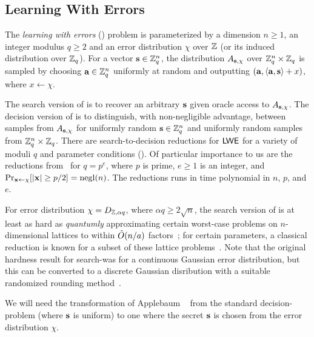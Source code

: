 \subsection{Learning With Errors}
\label{subsec:LWE}

The \emph{learning with errors} (\lwe) problem is parameterized by a
dimension $n\geq 1$, an integer modulus $q \geq 2$ and an error
distribution $\chi$ over $\mathbb{Z}$ (or its induced distribution over
$\mathbb{Z}_q$). For a vector $\mathbf{s} \in \mathbb{Z}_q^n$, the distribution $A_{\mathbf{s},
  \chi}$ over $\mathbb{Z}_q^n \times \mathbb{Z}_q$ is sampled by choosing $\mathbf{a} \in
\mathbb{Z}_q^n$ uniformly at random and outputting $(\mathbf{a}, \langle{\ensuremath{\mathbf{a}},
  \ensuremath{\mathbf{s}}}\rangle+x)$, where $x \gets \chi$.

The search version of \lwe is to recover an arbitrary $\mathbf{s}$ given
oracle access to $A_{\mathbf{s}, \chi}$. The decision version of \lwe is to
distinguish, with non-negligible advantage, between samples from
$A_{\mathbf{s}, \chi}$ for uniformly random $\mathbf{s} \in \mathbb{Z}_q^n$ and uniformly
random samples from $\mathbb{Z}_q^n \times \mathbb{Z}_q$. There are search-to-decision
reductions for $\mathsf{LWE}$ for a variety of moduli $q$ and parameter
conditions (\cite{DBLP:journals/jacm/Regev09,
  DBLP:conf/stoc/Peikert09,
  DBLP:conf/crypto/ApplebaumCPS09,DBLP:conf/crypto/MicciancioM11,
  DBLP:conf/eurocrypt/MicciancioP12}).  Of particular importance to us
are the reductions
from~\cite{DBLP:conf/crypto/ApplebaumCPS09,DBLP:conf/eurocrypt/MicciancioP12}
for $q=p^e$, where $p$ is prime, $e \geq 1$ is an integer, and
$\Pr_{\mathbf{x} \gets \chi}[\lvert{\ensuremath{\mathbf{x}}}\rvert \geq p/2] = \operatorname{negl}(n)$.  The
reductions runs in time polynomial in $n$, $p$, and $e$.

For error distribution $\chi = D_{\mathbb{Z}, \alpha q}$, where $\alpha q \geq
2\sqrt{n}$, the search version of \lwe is at least as hard as
\emph{quantumly} approximating certain worst-case problems on
$n$-dimensional lattices to within $\tilde{O}(n/a)$
factors~\cite{DBLP:journals/jacm/Regev09}; for certain parameters, a
classical reduction is known for a subset of these lattice
problems~\cite{DBLP:conf/stoc/Peikert09}.
Note that the original hardness result for search-\lwe was for a
continuous Gaussian error distribution, but this can be converted to a
discrete Gaussian disribution with a suitable randomized rounding
method~\cite{DBLP:conf/crypto/Peikert10}.

We will need the transformation of Applebaum
\etal~\cite{DBLP:conf/crypto/ApplebaumCPS09} from the standard
decision-\lwe problem (where $\mathbf{s}$ is uniform) to one where the
secret $\mathbf{s}$ is chosen from the error distribution $\chi$.


